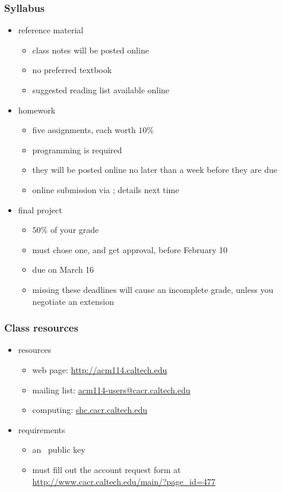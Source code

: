 \begin{frame}[fragile]
%
  \frametitle{Syllabus}
%
%
  \begin{itemize}
%
  \item reference material
    \begin{itemize}
    \item class notes will be posted online
    \item no preferred textbook
    \item suggested reading list available online
    \end{itemize}
%
  \item homework
    \begin{itemize}
    \item five assignments, each worth $10\%$ 
    \item programming is required
    \item they will be posted online no later than a week before they are due
    \item online submission via \bzr; details next time
    \end{itemize}
%
  \item final project
    \begin{itemize}
    \item $50\%$ of your grade
    \item must chose one, and get approval, before February 10
    \item due on March 16
    \item missing these deadlines will cause an incomplete grade, unless you negotiate an
      extension
    \end{itemize}
%
  \end{itemize}
%
\end{frame}

\begin{frame}[fragile]
%
  \frametitle{Class resources}
%
%
  \begin{itemize}
%
  \item resources
    \begin{itemize}
    \item web page: \url{http://acm114.caltech.edu}
    \item mailing list: \url{acm114-users@cacr.caltech.edu}
    \item computing: \url{shc.cacr.caltech.edu}
    \end{itemize}
%
  \item requirements
    \begin{itemize}
    \item an \ssh\ public key
    \item must fill out the account request form at
      \url{http://www.cacr.caltech.edu/main/?page_id=477}
    \end{itemize}
      
%
  \end{itemize}
%
\end{frame}

